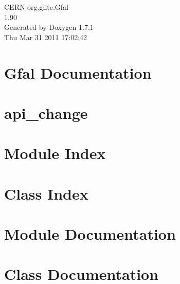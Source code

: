 \documentclass[a4paper]{book}
\begin{document}
\begin{titlepage}
\vspace*{7cm}
\begin{center}
{\Large CERN org.glite.Gfal \\[1ex]\large 1.90 }\\
\vspace*{1cm}
{\large Generated by Doxygen 1.7.1}\\
\vspace*{0.5cm}
{\small Thu Mar 31 2011 17:02:42}\\
\end{center}
\end{titlepage}
\clearemptydoublepage
{}
\tableofcontents
\clearemptydoublepage
{}
\chapter{Gfal Documentation}
\label{index}
\chapter{api\_\-change}
\label{api_change}

\chapter{Module Index}

\chapter{Class Index}

\chapter{Module Documentation}







\chapter{Class Documentation}














\printindex
\end{document}
